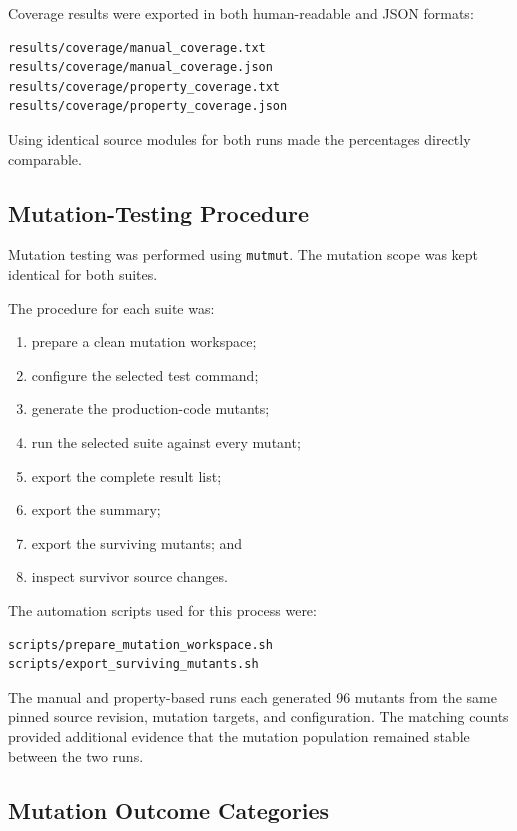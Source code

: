 \documentclass[12pt]{article}
\begin{document}
Coverage results were exported in both human-readable and JSON formats:

\begin{verbatim}
results/coverage/manual_coverage.txt
results/coverage/manual_coverage.json
results/coverage/property_coverage.txt
results/coverage/property_coverage.json
\end{verbatim}

Using identical source modules for both runs made the percentages directly
comparable.

\subsection{Mutation-Testing Procedure}

Mutation testing was performed using \texttt{mutmut}. The mutation scope was
kept identical for both suites.

The procedure for each suite was:

\begin{enumerate}
    \item prepare a clean mutation workspace;
    \item configure the selected test command;
    \item generate the production-code mutants;
    \item run the selected suite against every mutant;
    \item export the complete result list;
    \item export the summary;
    \item export the surviving mutants; and
    \item inspect survivor source changes.
\end{enumerate}

The automation scripts used for this process were:

\begin{verbatim}
scripts/prepare_mutation_workspace.sh
scripts/export_surviving_mutants.sh
\end{verbatim}

The manual and property-based runs each generated 96 mutants from the same
pinned source revision, mutation targets, and configuration. The matching
counts provided additional evidence that the mutation population remained
stable between the two runs.

\subsection{Mutation Outcome Categories}
\end{document}
